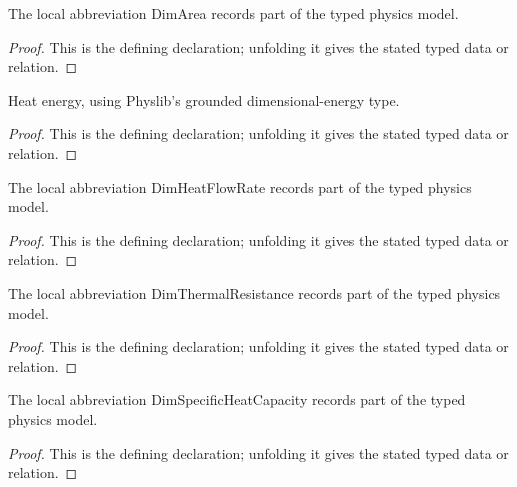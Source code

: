\begin{definition}[DimArea]
  \label{decl:physics:IPhO_2026_4_C_6:DimArea}
  The local abbreviation DimArea records part of the typed physics model.
\end{definition}
\begin{proof}
  This is the defining declaration; unfolding it gives the stated typed data or relation.
\end{proof}

\begin{definition}[DimHeatEnergy]
  \label{decl:physics:IPhO_2026_4_C_6:DimHeatEnergy}
  Heat energy, using Physlib's grounded dimensional-energy type.
\end{definition}
\begin{proof}
  This is the defining declaration; unfolding it gives the stated typed data or relation.
\end{proof}

\begin{definition}[DimHeatFlowRate]
  \label{decl:physics:IPhO_2026_4_C_6:DimHeatFlowRate}
  The local abbreviation DimHeatFlowRate records part of the typed physics model.
\end{definition}
\begin{proof}
  This is the defining declaration; unfolding it gives the stated typed data or relation.
\end{proof}

\begin{definition}[DimThermalResistance]
  \label{decl:physics:IPhO_2026_4_C_6:DimThermalResistance}
  The local abbreviation DimThermalResistance records part of the typed physics model.
\end{definition}
\begin{proof}
  This is the defining declaration; unfolding it gives the stated typed data or relation.
\end{proof}

\begin{definition}[DimSpecificHeatCapacity]
  \label{decl:physics:IPhO_2026_4_C_6:DimSpecificHeatCapacity}
  The local abbreviation DimSpecificHeatCapacity records part of the typed physics model.
\end{definition}
\begin{proof}
  This is the defining declaration; unfolding it gives the stated typed data or relation.
\end{proof}

